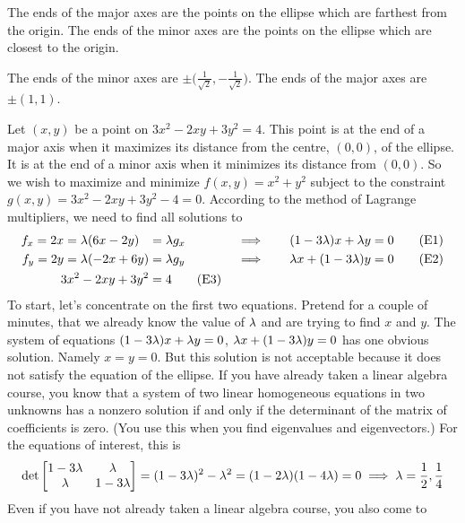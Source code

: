 \begin{hint}
The ends of the major axes are the points on the ellipse which are 
farthest from the origin.
The ends of the minor axes are the points on the ellipse which are 
closest to the origin.
\end{hint}

\begin{answer}
The ends of the minor axes are $\pm\big(\frac{1}{\sqrt{2}},-\frac{1}{\sqrt{2}}\big)$.
The ends of the major axes are $\pm(1,1)$.
\end{answer}

\begin{solution}
Let $(x,y)$ be a point on $3x^2-2xy+3y^2=4$. This point is at
the end of a major axis when it maximizes its distance from the centre,
$(0,0)$, of the ellipse. It is at
the end of a minor axis when it minimizes its distance from $(0,0)$. So
we wish to maximize and minimize $f(x,y)=x^2+y^2$ subject to 
the constraint $g(x,y)=3x^2-2xy+3y^2-4=0$. 
According to the method of Lagrange multipliers, we need to find 
all solutions to
\begin{alignat*}{5}
f_x = 2x = \lambda (6x-2y)\phantom{-}  &= \lambda g_x 
      \quad&&\implies\quad & (1-3\lambda)x+\lambda y&=0 \tag{E1} \\ 
f_y = 2y = \lambda (-2x+6y) &= \lambda g_y 
      \quad&&\implies\quad & \lambda x+(1-3\lambda)y&=0\tag{E2} \\ 
3x^2-2xy+3y^2&=4 \tag{E3}
\end{alignat*}
To start, let's concentrate on the first two equations. Pretend for a couple
of minutes, that we already know the value of $\lambda$ and are trying to find
$x$ and $y$. The system of equations
 $(1-3\lambda)x+\lambda y=0$, $\lambda x+(1-3\lambda)y=0$ 
has one obvious solution. Namely $x=y=0$. But this solution is not acceptable
because it does not satisfy the equation of the ellipse. If you have already
taken a linear algebra course, you know that a system of two linear homogeneous
equations in two unknowns has a nonzero solution if and only if the determinant
of the matrix of coefficients is zero. (You use this when you find eigenvalues
and eigenvectors.) For the equations of interest, this
is 
\begin{align*}
\det\left[\begin{matrix}1-3\lambda&\lambda\\ \lambda&1-3\lambda\end{matrix}\right]
           =(1-3\lambda)^2-\lambda^2
=(1-2\lambda)(1-4\lambda)=0\implies\lambda=\frac{1}{2},\frac{1}{4}
\end{align*}
Even if you have not already taken a linear algebra course, you also come to

\end{solution}
